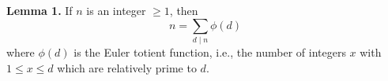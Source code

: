 \textbf{Lemma 1.} If $n$ is an integer $\geq 1$, then
$$n = \sum_{d \mid n} \phi(d)$$
where $\phi(d)$ is the Euler totient function, i.e., the number of integers $x$ with $1 \leq x \leq d$ which are relatively prime to $d$.
